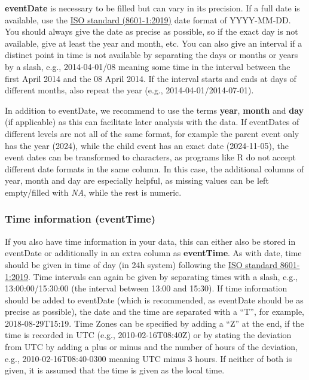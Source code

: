 \documentclass[
  oneside]{book}
\begin{document}
\textbf{eventDate} is necessary to be filled but can vary in its precision. If a full date is available, use the \href{https://www.iso.org/obp/ui/en/\#iso:std:iso:8601:-1:ed-1:v1:en}{ISO standard (8601-1:2019)} date format of YYYY-MM-DD. You should always give the date as precise as possible, so if the exact day is not available, give at least the year and month, etc. You can also give an interval if a distinct point in time is not available by separating the days or months or years by a slash, e.g., 2014-04-01/08 meaning some time in the interval between the first April 2014 and the 08 April 2014. If the interval starts and ends at days of different months, also repeat the year (e.g., 2014-04-01/2014-07-01).

In addition to eventDate, we recommend to use the terms \textbf{year}, \textbf{month} and \textbf{day} (if applicable) as this can facilitate later analysis with the data. If eventDates of different levels are not all of the same format, for example the parent event only has the year (2024), while the child event has an exact date (2024-11-05), the event dates can be transformed to characters, as programs like R do not accept different date formats in the same column. In this case, the additional columns of year, month and day are especially helpful, as missing values can be left empty/filled with \emph{NA}, while the rest is numeric.

\subsubsection{Time information (eventTime)}\label{time-information-eventtime}

If you also have time information in your data, this can either also be stored in eventDate or additionally in an extra column as \textbf{eventTime}. As with date, time should be given in time of day (in 24h system) following the \href{https://www.iso.org/obp/ui/en/\#iso:std:iso:8601:-1:ed-1:v1:en}{ISO standard 8601-1:2019}. Time intervals can again be given by separating times with a slash, e.g., 13:00:00/15:30:00 (the interval between 13:00 and 15:30). If time information should be added to eventDate (which is recommended, as eventDate should be as precise as possible), the date and the time are separated with a ``T'', for example, 2018-08-29T15:19. Time Zones can be specified by adding a ``Z'' at the end, if the time is recorded in UTC (e.g., 2010-02-16T08:40Z) or by stating the deviation from UTC by adding a plus or minus and the number of hours of the deviation, e.g., 2010-02-16T08:40-0300 meaning UTC minus 3 hours. If neither of both is given, it is assumed that the time is given as the local time.
\end{document}
